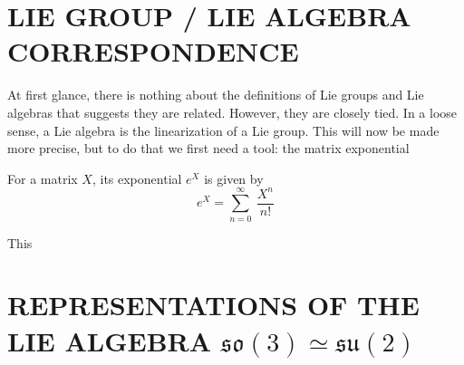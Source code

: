 \documentclass[9 pt]{report}
\begin{document}
{\centering
\section*{LIE GROUP / LIE ALGEBRA CORRESPONDENCE}}
\noindent At first glance, there is nothing about the definitions of Lie groups and Lie algebras that suggests they are related. However, they are closely tied. In a loose sense, a Lie algebra is the linearization of a Lie group. This will now be made more precise, but to do that we first need a tool: the matrix exponential

\begin{tcolorbox}
	For a matrix $X$, its exponential $e^X$ is given by
	$$ e^{X} = \sum_{n=0}^\infty\: \frac{X^n}{n!} $$
\end{tcolorbox}

\noindent This


\newpage

{\centering
\section*{REPRESENTATIONS OF THE LIE ALGEBRA $\mathfrak{so}(3) \simeq \mathfrak{su}(2)$} }











\pagebreak
\end{document}

